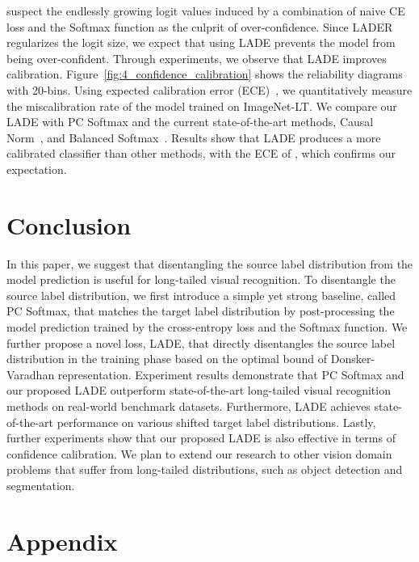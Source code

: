 \documentclass[final]{cvpr}
\begin{document}
\cite{muller2019does} suspect the endlessly growing logit values induced by a combination of naive CE loss and the Softmax function as the culprit of over-confidence.
Since LADER regularizes the logit size, we expect that using LADE prevents the model from being over-confident.
Through experiments, we observe that LADE improves calibration.
Figure~\ref{fig:4_confidence_calibration} shows the reliability diagrams with 20-bins.
Using expected calibration error (ECE)~\cite{naeini2015obtaining}, we quantitatively measure the miscalibration rate of the model trained on ImageNet-LT.
We compare our LADE with PC Softmax and the current state-of-the-art methods, Causal Norm~\cite{tang2020long}, and Balanced Softmax~\cite{ren2020balanced}.
Results show that LADE produces a more calibrated classifier than other methods, with the ECE of , which confirms our expectation. \section{Conclusion}\label{sec:5_conclusion}
In this paper, we suggest that disentangling the source label distribution from the model prediction is useful for long-tailed visual recognition.
To disentangle the source label distribution, we first introduce a simple yet strong baseline, called PC Softmax, that matches the target label distribution by post-processing the model prediction trained by the cross-entropy loss and the Softmax function.
We further propose a novel loss, LADE, that directly disentangles the source label distribution in the training phase based on the optimal bound of Donsker-Varadhan representation.
Experiment results demonstrate that PC Softmax and our proposed LADE outperform state-of-the-art long-tailed visual recognition methods on real-world benchmark datasets.
Furthermore, LADE achieves state-of-the-art performance on various shifted target label distributions.
Lastly, further experiments show that our proposed LADE is also effective in terms of confidence calibration.
We plan to extend our research to other vision domain problems that suffer from long-tailed distributions, such as object detection and segmentation. \clearpage
{\small


}

\clearpage
\section*{Appendix}\label{sec:6_appendix}
\setcounter{section}{6}
\setcounter{equation}{21}
\setcounter{figure}{5}
\setcounter{table}{6}
\end{document}
